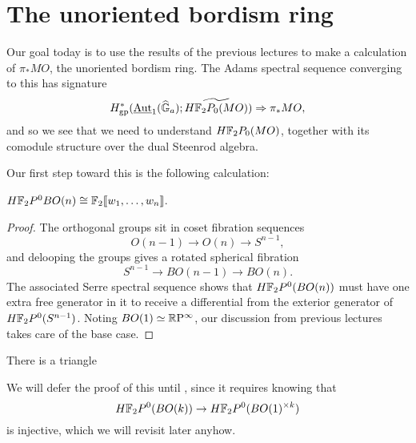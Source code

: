 








\section{The unoriented bordism ring}

Our goal today is to use the results of the previous lectures to make a calculation of $\pi_* MO$, the unoriented bordism ring.  The Adams spectral sequence converging to this has signature \[H^*_{\mathrm{gp}}(\operatorname{\underline{\smash{\operatorname{Aut}}}}_1(\widehat{\mathbb G}_a); \widetilde{H\mathbb F_2P_0(MO)}) \Rightarrow \pi_* MO,\] and so we see that we need to understand $H\mathbb F_2P_0(MO)$, together with its comodule structure over the dual Steenrod algebra.

Our first step toward this is the following calculation:
\begin{lemma}
$H\mathbb F_2P^0 BO(n) \cong \mathbb F_2 \llbracket w_1, \ldots, w_n \rrbracket$.
\end{lemma}
\begin{proof}
The orthogonal groups sit in coset fibration sequences \[O(n-1) \to O(n) \to S^{n-1},\] and delooping the groups gives a rotated spherical fibration \[S^{n-1} \to BO(n-1) \to BO(n).\]  The associated Serre spectral sequence shows that $H\mathbb F_2P^0(BO(n))$ must have one extra free generator in it to receive a differential from the exterior generator of $H\mathbb F_2P^0(S^{n-1})$.  Noting $BO(1) \simeq \mathbb R\mathrm P^\infty$, our discussion from previous lectures takes care of the base case.
\end{proof}

\begin{corollary}
There is a triangle
\begin{center}
\end{center}
\end{corollary}
\noindent We will defer the proof of this until , since it requires knowing that \[H\mathbb F_2P^0(BO(k)) \to H\mathbb F_2P^0(BO(1)^{\times k})\] is injective, which we will revisit later anyhow.


